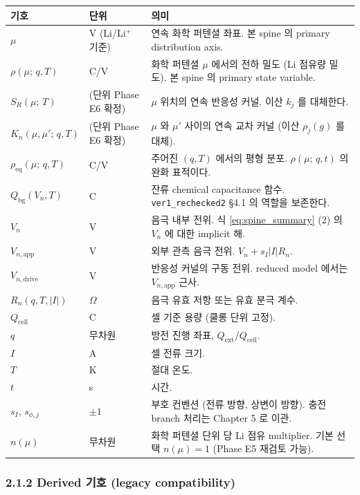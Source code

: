 \documentclass[11pt,a4paper]{article}
\newcommand{\app}{\mathrm{app}}
\newcommand{\drive}{\mathrm{drive}}
\newcommand{\eq}{\mathrm{eq}}
\newcommand{\bg}{\mathrm{bg}}
\newcommand{\cell}{\mathrm{cell}}
\newcommand{\ext}{\mathrm{ext}}
\newcommand{\mucont}{\mu}
\newcommand{\rhomu}{\rho(\mucont;\, q, T)}
\newcommand{\rhoeq}{\rho_{\eq}(\mucont;\, q, T)}
\newcommand{\rhomut}{\rho(\mucont;\, q, t)}
\newcommand{\Sreact}{S_R(\mucont;\, T)}
\newcommand{\Kncross}{K_n(\mucont, \mucont';\, q, T)}
\newcommand{\nmu}{n(\mucont)}
\begin{document}
\begin{longtable}{p{} p{} p{}}
\toprule
기호 & 단위 & 의미 \\
\midrule
\endhead
$\mucont$ & V (Li/Li$^+$ 기준) & 연속 화학 퍼텐셜 좌표. 본 spine 의 primary
    distribution axis. \\
$\rhomu$ & C/V & 화학 퍼텐셜 $\mucont$ 에서의 전하 밀도 (Li 점유량 밀도). 본
    spine 의 primary state variable. \\
$\Sreact$ & (단위 Phase E6 확정) & $\mucont$ 위치의 연속 반응성 커널. 이산 $k_j$
    를 대체한다. \\
$\Kncross$ & (단위 Phase E6 확정) & $\mucont$ 와 $\mucont'$ 사이의 연속 교차 커널
    (이산 $\rho_j(g)$ 를 대체). \\
$\rhoeq$ & C/V & 주어진 $(q, T)$ 에서의 평형 분포. $\rhomut$ 의 완화 표적이다. \\
$Q_{\bg}(V_n, T)$ & C & 잔류 chemical capacitance 함수. \texttt{ver1\_rechecked2}
    §4.1 의 역할을 보존한다. \\
$V_n$ & V & 음극 내부 전위. 식 \eqref{eq:spine_summary} (2) 의 $V_n$ 에 대한
    implicit 해. \\
$V_{n,\app}$ & V & 외부 관측 음극 전위. $V_n + s_I |I| R_n$. \\
$V_{n,\drive}$ & V & 반응성 커널의 구동 전위. reduced model 에서는 $V_{n,\app}$
    근사. \\
$R_n(q, T, |I|)$ & $\Omega$ & 음극 유효 저항 또는 유효 분극 계수. \\
$Q_{\cell}$ & C & 셀 기준 용량 (쿨롱 단위 고정). \\
$q$ & 무차원 & 방전 진행 좌표, $Q_{\ext}/Q_{\cell}$. \\
$I$ & A & 셀 전류 크기. \\
$T$ & K & 절대 온도. \\
$t$ & s & 시간. \\
$s_I,\, s_{\phi,j}$ & $\pm 1$ & 부호 컨벤션 (전류 방향, 상변이 방향). 충전 branch
    처리는 Chapter 5 로 이관. \\
$\nmu$ & 무차원 & 화학 퍼텐셜 단위 당 Li 점유 multiplier. 기본 선택 $\nmu = 1$
    (Phase E5 재검토 가능). \\
\bottomrule
\end{longtable}

\subsubsection*{2.1.2 Derived 기호 (legacy compatibility)}
\end{document}
